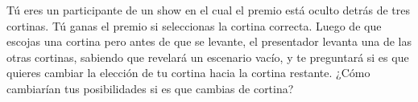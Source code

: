 \begin{statement}{6}
  T\'u eres un participante de un show en el cual el premio est\'a oculto detr\'as de tres cortinas.
  T\'u ganas el premio si seleccionas la cortina correcta.
  Luego de que escojas una cortina pero antes de que se levante, el presentador levanta una de las
  otras cortinas, sabiendo que revelar\'a un escenario vac\'io, y te preguntar\'a si es que quieres
  cambiar la elecci\'on de tu cortina hacia la cortina restante.
  ¿C\'omo cambiar\'ian tus posibilidades si es que cambias de cortina?
\end{statement}